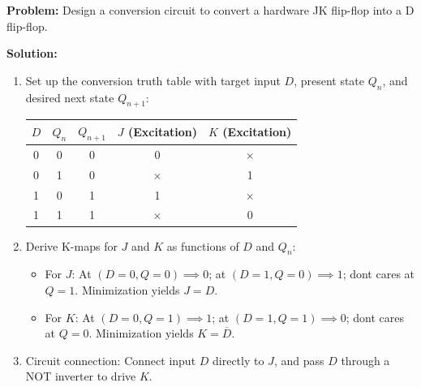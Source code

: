 \begin{examplebox}
\textbf{Problem:} Design a conversion circuit to convert a hardware JK flip-flop into a D flip-flop.

\textbf{Solution:}
\begin{enumerate}
    \item Set up the conversion truth table with target input $D$, present state $Q_n$, and desired next state $Q_{n+1}$:
    \begin{center}
    \begin{tabular}{c c c | c c}
    \toprule
    $D$ & $Q_n$ & $Q_{n+1}$ & $J$ (Excitation) & $K$ (Excitation) \\
    \midrule
    0 & 0 & 0 & 0 & $\times$ \\
    0 & 1 & 0 & $\times$ & 1 \\
    1 & 0 & 1 & 1 & $\times$ \\
    1 & 1 & 1 & $\times$ & 0 \\
    \bottomrule
    \end{tabular}
    \end{center}
    \item Derive K-maps for $J$ and $K$ as functions of $D$ and $Q_n$:
    \begin{itemize}
        \item For $J$: At $(D=0, Q=0) \implies 0$; at $(D=1, Q=0) \implies 1$; don\textquotesingle t cares at $Q=1$. Minimization yields $J = D$.
        \item For $K$: At $(D=0, Q=1) \implies 1$; at $(D=1, Q=1) \implies 0$; don\textquotesingle t cares at $Q=0$. Minimization yields $K = \overline{D}$.
    \end{itemize}
    \item Circuit connection: Connect input $D$ directly to $J$, and pass $D$ through a NOT inverter to drive $K$.
\end{enumerate}
\end{examplebox}

